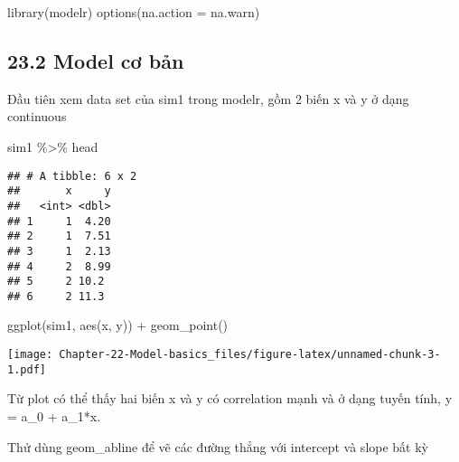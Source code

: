 \documentclass[
]{article}
\newenvironment{Shaded}{\begin{snugshade}}{\end{snugshade}}
\newcommand{\AttributeTok}[1]{\textcolor[rgb]{0.77,0.63,0.00}{#1}}
\newcommand{\FunctionTok}[1]{\textcolor[rgb]{0.00,0.00,0.00}{#1}}
\newcommand{\NormalTok}[1]{#1}
\newcommand{\SpecialCharTok}[1]{\textcolor[rgb]{0.00,0.00,0.00}{#1}}
\begin{document}
\begin{Shaded}
\begin{Highlighting}[]
\FunctionTok{library}\NormalTok{(modelr)}
\FunctionTok{options}\NormalTok{(}\AttributeTok{na.action =}\NormalTok{ na.warn)}
\end{Highlighting}
\end{Shaded}

\hypertarget{model-cux1a1-bux1ea3n}{%
\subsection{23.2 Model cơ bản}\label{model-cux1a1-bux1ea3n}}

Đầu tiên xem data set của sim1 trong modelr, gồm 2 biến x và y ở dạng
continuous

\begin{Shaded}
\begin{Highlighting}[]
\NormalTok{sim1 }\SpecialCharTok{\%\textgreater{}\%}\NormalTok{ head}
\end{Highlighting}
\end{Shaded}

\begin{verbatim}
## # A tibble: 6 x 2
##       x     y
##   <int> <dbl>
## 1     1  4.20
## 2     1  7.51
## 3     1  2.13
## 4     2  8.99
## 5     2 10.2 
## 6     2 11.3
\end{verbatim}

\begin{Shaded}
\begin{Highlighting}[]
\FunctionTok{ggplot}\NormalTok{(sim1, }\FunctionTok{aes}\NormalTok{(x, y)) }\SpecialCharTok{+}
         \FunctionTok{geom\_point}\NormalTok{()}
\end{Highlighting}
\end{Shaded}

\texttt{[image: Chapter-22-Model-basics\_files/figure-latex/unnamed-chunk-3-1.pdf]}

Từ plot có thể thấy hai biến x và y có correlation mạnh và ở dạng tuyến
tính, y = a\_0 + a\_1*x.

Thử dùng geom\_abline để vẽ các đường thẳng với intercept và slope bất
kỳ
\end{document}
